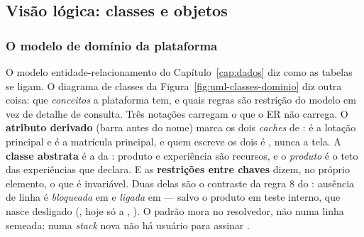 \subsection{Visão lógica: classes e objetos}
\label{sec:uml-logica}

\subsubsection{O modelo de domínio da plataforma}

O modelo entidade-relacionamento do Capítulo~\ref{cap:dados} diz como as tabelas
se ligam. O diagrama de classes da Figura~\ref{fig:uml-classes-dominio} diz outra
coisa: que \emph{conceitos} a plataforma tem, e quais regras são restrição do
modelo em vez de detalhe de consulta. Três notações carregam o que o ER não
carrega. O \textbf{atributo derivado} (barra antes do nome) marca os dois
\emph{caches} de :  é a lotação principal e  é a
matrícula principal, e quem escreve os dois é , nunca a tela. A
\textbf{classe abstrata}  é a da : produto e experiência
são recursos, e o \emph{produto} é o teto das experiências que declara. E as
\textbf{restrições entre chaves} dizem, no próprio elemento, o que é invariável.
Duas delas são o contraste da regra 8 do : ausência de linha é
\emph{bloqueada} em  e \emph{ligada} em  ---
salvo o produto em teste interno, que nasce desligado
(, hoje só a ,
). O padrão mora no resolvedor, não numa linha semeada: numa
\emph{stack} nova não há usuário para assinar .

